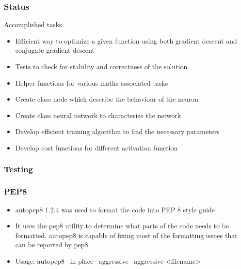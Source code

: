 \documentclass[10pt]{beamer}
\begin{document}
\begin{frame}
\frametitle{Status}
\begin{block}{Accomplished tasks}
\begin{itemize}
\item{Efficient way to optimize a given function using both gradient descent and conjugate gradient descent}
\item{Tests to check for stability and correctness of the solution}
\item{Helper functions for various maths associated tasks}
\item{Create class node which describe the behaviour of the neuron}
\item{Create class neural network to characterize the network}
\item{Develop efficient training algorithm to find the necessary parameters}
\item{Develop cost functions for different activation function}
\end{itemize}
\end{block}
\end{frame}

\begin{frame}
\frametitle{Testing}
\centering\tiny
\centering\tiny
\end{frame}

\begin{frame}
\frametitle{PEP8}
\begin{block}{}
\begin{itemize}
\item{autopep8 1.2.4 was used to format the code into PEP 8 style guide}
\item{It uses the pep8 utility to determine what parts of the code needs to be formatted. autopep8 is capable of fixing most of the formatting issues that can be reported by pep8.}
\item{Usage: autopep8 --in-place --aggressive --aggressive \textless filename\textgreater}
\end{itemize}
\end{block}
\end{frame}
\end{document}
